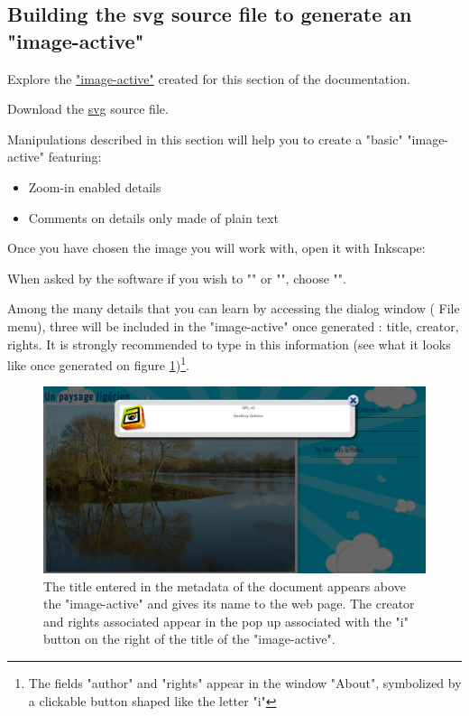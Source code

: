 \subsection{Building the svg source file to generate an "image-active"}\label{preparation_svg}

\begin{links}
Explore the \href{http://images-actives.crdp-versailles.fr/beta/demo/tuto/xia1}{"image-active"} created for this section of the documentation.

Download the \href{http://images-actives.crdp-versailles.fr/beta/demo/tuto/xia1/svg/xia1.svg}{svg} source file.
\end{links}

Manipulations described in this section will help you to
create a "basic" "image-active" featuring:
\begin{itemize}
 \item Zoom-in enabled details
 \item Comments on details only made of plain text
\end{itemize}


Once you have chosen the image you will work with, open it with Inkscape:


When asked by the software if you wish to "" or "", choose "".

Among the many details that you can learn by accessing the 
dialog window  (\chemin
{File} menu), three will be included in the "image-active" once
generated : title, creator, rights. It is strongly recommended to type in this information
(see what it looks like once generated on figure \ref{titre_ia})\footnote{The
fields "author" and "rights" appear in the window
"About", symbolized by a clickable button shaped like the letter "i"}.

\begin{figure}[htp]
 \centering
 \includegraphics[width=\textwidth,clip=true,trim=0mm 120mm 55mm 0mm ]{images/titre_ia}
 \caption{The title entered in the metadata of the document appears above 
the "image-active" and gives its name to the web page. The creator and 
 rights associated appear in the pop up associated with the "i" button 
on the right of the title of the "image-active".}
 \label{titre_ia}
\end{figure}

